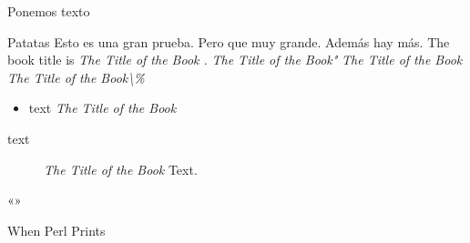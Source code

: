Ponemos texto

\salto



\lulu

Patatas
Esto es una gran prueba. Pero que muy grande. Además
hay más.
The book title is
\emph{The Title of the Book .}
\emph{The Title of the Book"}
\emph{The Title of the Book}
\emph{The Title of the Book\textbackslash{}\%}
\begin{itemize}
\item text
\emph{The Title of the Book}
\end{itemize}
\begin{description}
\item[text]
\emph{The Title of the Book}
Text.
\end{description}
«»

When Perl Prints
